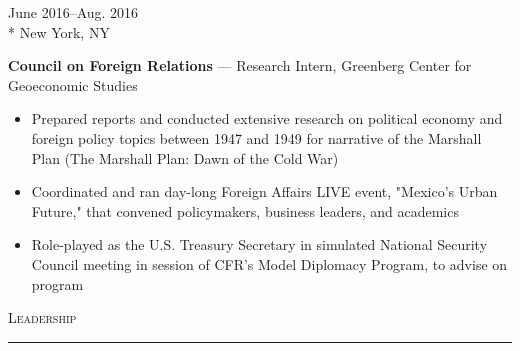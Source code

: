 \documentclass[a4paper,9pt]{article}
\begin{document}
\vspace{-3ex}
\begin{minipage}[t]{0.20\linewidth}
	\begin{small}
		\begin{spacing}{1.00}
			\begin{flushright}
				June 2016--Aug. 2016
				\\*
				\vspace*{2.5pt}
				New York, NY
			\end{flushright}
		\end{spacing}
	\end{small}
\end{minipage}
\hspace{4mm}
\begin{minipage}[t]{0.75\linewidth}
	\begin{small}
		\begin{spacing}{1.00}
			\begin{flushleft}
				\textbf{Council on Foreign Relations} --- Research Intern, Greenberg Center for Geoeconomic Studies
				\begin{itemize}[itemsep=0pt,topsep=2.5pt,leftmargin=*]
					\item Prepared reports and conducted extensive research on political economy and foreign policy topics between 1947 and 1949 for narrative of the Marshall Plan (The Marshall Plan: Dawn of the Cold War)
					\item Coordinated and ran day-long Foreign Affairs LIVE event, "Mexico's Urban Future," that convened policymakers, business leaders, and academics
					\item Role-played as the U.S. Treasury Secretary in simulated National Security Council meeting in session of CFR's Model Diplomacy Program, to advise on program
				\end{itemize}
			\end{flushleft}
		\end{spacing}
	\end{small}
\end{minipage}

\vspace{-6ex}
\vspace*{25pt}

\begin{Large}
	\textsc{Leadership}
\end{Large}
\vspace*{5pt}
\hrule
\vspace*{5pt}
\end{document}
